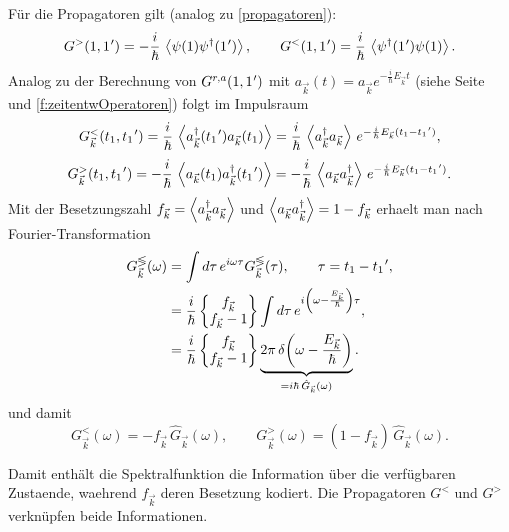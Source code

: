 Für die Propagatoren gilt (analog zu
\autoref{propagatoren}):
\begin{equation}
  G^{>}(1,1\mkern1mu')=-\frac{i}{\hbar}\,\left\langle\psi(1)\psi^{\dagger}(1\mkern1mu')\right\rangle,
  \qquad
  G^{<}(1,1\mkern1mu')=\frac{i}{\hbar}\,\left\langle\psi^{\dagger}(1\mkern1mu')\psi(1)\right\rangle.
\end{equation}
Analog zu der Berechnung von $G^{r,a}(1,1\mkern1mu')$ mit $a_{\vec k}(t)=a_{\vec k}e^{-\frac{i}{\hbar}E_{\vec k}t}$ (siehe Seite \pageref{f:BeginGra} und \autoref{f:zeitentwOperatoren}) folgt im Impulsraum
\begin{equation}
  G^{<}_{\vec k}(t_1,t_1\mkern1mu')
  = \frac{i}{\hbar}\,\left\langle a^{\dagger}_{\vec k}(t_1\mkern1mu')a_{\vec k}(t_1)\right\rangle
  = \frac{i}{\hbar}\,\left\langle a^{\dagger}_{\vec k}a_{\vec k}\right\rangle\,e^{-\frac{i}{\hbar}E_{\vec k}(t_1-t_1\mkern1mu')},
\end{equation}
\begin{equation}
  G^{>}_{\vec k}(t_1,t_1\mkern1mu')
  = -\frac{i}{\hbar}\,\left\langle a_{\vec k}(t_1)a^{\dagger}_{\vec k}(t_1\mkern1mu')\right\rangle
  = -\frac{i}{\hbar}\,\left\langle a_{\vec k}a^{\dagger}_{\vec k}\right\rangle\,e^{-\frac{i}{\hbar}E_{\vec k}(t_1-t_1\mkern1mu')}.
\end{equation}
Mit der Besetzungszahl $f_{\vec k}=\left\langle a^{\dagger}_{\vec k}a_{\vec k}\right\rangle$ und
$\left\langle a_{\vec k}a^{\dagger}_{\vec k}\right\rangle=1-f_{\vec k}$ erhaelt man nach Fourier-Transformation
\begin{equation}
  \begin{aligned}
    G^{\lessgtr}_{\vec k}(\omega)
     & = \int d\tau\,e^{i\omega\tau}G^{\lessgtr}_{\vec k}(\tau),
    \qquad \tau=t_1-t_1\mkern1mu',                                     \\
     & = \frac{i}{\hbar}
    \begin{Bmatrix}
      f_{\vec k} \\
      f_{\vec k}-1
    \end{Bmatrix}
    \int d\tau\,e^{i\left(\omega-\frac{E_{\vec k}}{\hbar}\right)\tau}, \\
     & = \frac{i}{\hbar}
    \begin{Bmatrix}
      f_{\vec k} \\
      f_{\vec k}-1
    \end{Bmatrix}
    \underbrace{2\pi\,\delta\!\left(\omega-\frac{E_{\vec k}}{\hbar}\right)}_{=i\hbar\,\hat G_{\vec k}(\omega)}.
  \end{aligned}
\end{equation}
und damit
\begin{equation}
  G^{<}_{\vec k}(\omega)=-f_{\vec k}\,\hat G_{\vec k}(\omega),
  \qquad
  G^{>}_{\vec k}(\omega)=(1-f_{\vec k})\,\hat G_{\vec k}(\omega).
\end{equation}

Damit enthält die Spektralfunktion die
Information über die verfügbaren Zustaende,
waehrend $f_{\vec k}$ deren Besetzung kodiert.
Die Propagatoren $G^{<}$ und $G^{>}$ verknüpfen
beide Informationen.